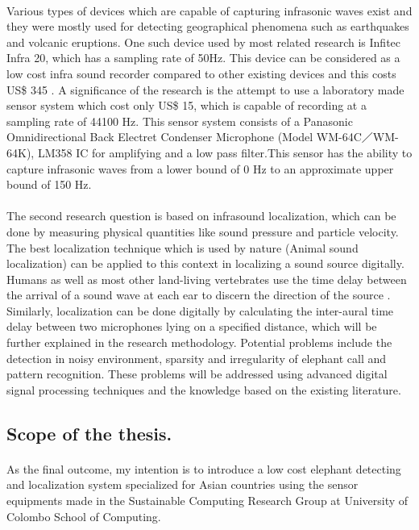 \documentclass[12pt]{article}
\numberwithin{figure}{section}
\numberwithin{table}{section}
\begin{document}
\paragraph{}
Various types of devices which are capable of capturing infrasonic waves exist and they were mostly used for detecting geographical phenomena such as earthquakes and volcanic eruptions. One such device used by most related research is Infitec Infra 20, which has a sampling rate of 50Hz. This device can be considered as a low cost infra sound recorder compared to other existing devices and this costs US\$ 345 \cite {7}. A significance of the research is the attempt to use a laboratory made sensor system which cost only US\$ 15, which is capable of recording at a sampling rate of 44100 Hz. This sensor system consists of a Panasonic Omnidirectional Back Electret Condenser Microphone \cite{15} (Model WM-64C／WM-64K), LM358 IC for amplifying and a low pass filter\cite{16}.This sensor has the ability to capture infrasonic waves from a lower bound of 0 Hz to an approximate upper bound of 150 Hz.


\paragraph{}
The second research question is based on infrasound localization, which can be done by measuring physical quantities like sound pressure and particle velocity. The best localization technique which is used by nature (Animal sound localization) can be applied to this context in localizing a sound source digitally. Humans as well as most other land-living vertebrates use the time delay between the arrival of a sound wave at each ear to discern the direction of the source \cite {8}. Similarly, localization can be done digitally by calculating the inter-aural time delay  between two microphones lying on a specified distance, which will be further explained in the research methodology. Potential problems include the detection in noisy environment, sparsity and irregularity of elephant call and pattern recognition. These problems will be addressed using advanced digital signal processing techniques and the knowledge based on the existing literature.

\subsection{Scope of the thesis.}
\paragraph{}
As the final outcome, my intention is to introduce a low cost elephant detecting and localization system specialized for Asian countries using the sensor equipments made in the Sustainable Computing Research Group at University of Colombo School of Computing.
\end{document}
